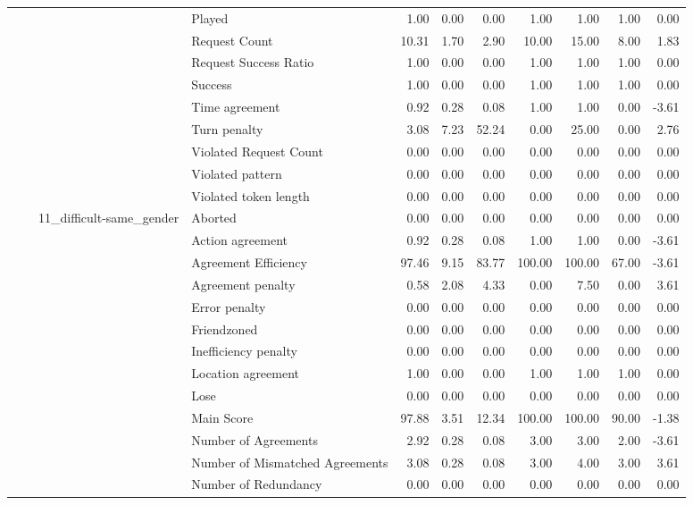 \begin{tabular}{llllrrrrrrr}
 &  &  & Played & 1.00 & 0.00 & 0.00 & 1.00 & 1.00 & 1.00 & 0.00 \\
 &  &  & Request Count & 10.31 & 1.70 & 2.90 & 10.00 & 15.00 & 8.00 & 1.83 \\
 &  &  & Request Success Ratio & 1.00 & 0.00 & 0.00 & 1.00 & 1.00 & 1.00 & 0.00 \\
 &  &  & Success & 1.00 & 0.00 & 0.00 & 1.00 & 1.00 & 1.00 & 0.00 \\
 &  &  & Time agreement & 0.92 & 0.28 & 0.08 & 1.00 & 1.00 & 0.00 & -3.61 \\
 &  &  & Turn penalty & 3.08 & 7.23 & 52.24 & 0.00 & 25.00 & 0.00 & 2.76 \\
 &  &  & Violated Request Count & 0.00 & 0.00 & 0.00 & 0.00 & 0.00 & 0.00 & 0.00 \\
 &  &  & Violated pattern & 0.00 & 0.00 & 0.00 & 0.00 & 0.00 & 0.00 & 0.00 \\
 &  &  & Violated token length & 0.00 & 0.00 & 0.00 & 0.00 & 0.00 & 0.00 & 0.00 \\
\cline{3-11}
 &  & \multirow[t]{27}{*}{11_difficult-same_gender} & Aborted & 0.00 & 0.00 & 0.00 & 0.00 & 0.00 & 0.00 & 0.00 \\
 &  &  & Action agreement & 0.92 & 0.28 & 0.08 & 1.00 & 1.00 & 0.00 & -3.61 \\
 &  &  & Agreement Efficiency & 97.46 & 9.15 & 83.77 & 100.00 & 100.00 & 67.00 & -3.61 \\
 &  &  & Agreement penalty & 0.58 & 2.08 & 4.33 & 0.00 & 7.50 & 0.00 & 3.61 \\
 &  &  & Error penalty & 0.00 & 0.00 & 0.00 & 0.00 & 0.00 & 0.00 & 0.00 \\
 &  &  & Friendzoned & 0.00 & 0.00 & 0.00 & 0.00 & 0.00 & 0.00 & 0.00 \\
 &  &  & Inefficiency penalty & 0.00 & 0.00 & 0.00 & 0.00 & 0.00 & 0.00 & 0.00 \\
 &  &  & Location agreement & 1.00 & 0.00 & 0.00 & 1.00 & 1.00 & 1.00 & 0.00 \\
 &  &  & Lose & 0.00 & 0.00 & 0.00 & 0.00 & 0.00 & 0.00 & 0.00 \\
 &  &  & Main Score & 97.88 & 3.51 & 12.34 & 100.00 & 100.00 & 90.00 & -1.38 \\
 &  &  & Number of Agreements & 2.92 & 0.28 & 0.08 & 3.00 & 3.00 & 2.00 & -3.61 \\
 &  &  & Number of Mismatched Agreements & 3.08 & 0.28 & 0.08 & 3.00 & 4.00 & 3.00 & 3.61 \\
 &  &  & Number of Redundancy & 0.00 & 0.00 & 0.00 & 0.00 & 0.00 & 0.00 & 0.00 \\

\end{tabular}
